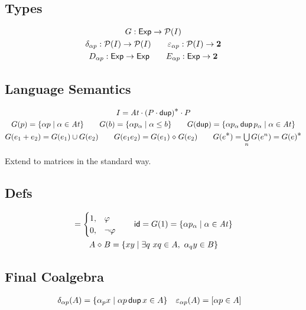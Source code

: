 \documentclass{article}
\newcommand\At{\ensuremath{\mathit{At}}}
\renewcommand\smash{\mathrel{\diamond}}
\newcommand\pdup{\mathop{\mathsf{dup}}}
\newcommand\Two{\mathbf{2}}
\newcommand\Exp{\mathsf{Exp}}
\newcommand\bval[1]{[#1]}
\renewcommand\star{^{\textstyle *}}
\newcommand\id{\mathsf{id}}
\newcommand\sbigcup{\mathop{\textstyle\bigcup}}
\begin{document}
\subsection*{Types}

\begin{gather*}
G: \Exp \fun \powerset I\\
\delta_{\alpha p} : \powerset I \fun \powerset I
\qquad
\eps_{\alpha p} : \powerset I \fun \Two\\
D_{\alpha p} : \Exp \fun \Exp
\qquad
E_{\alpha p} : \Exp \fun \Two
\end{gather*}

\subsection*{Language Semantics}

\begin{gather*}
I = \At\cdot (P\cdot\pdup)\star\cdot P\\
G(p) = \set{\alpha p}{\alpha\in\At} \qquad
G(b) = \set{\alpha p_\alpha}{\alpha\leq b} \qquad
G(\pdup) = \set{\alpha p_\alpha\pdup p_\alpha}{\alpha\in\At}\\
G(e_1+e_2) = G(e_1)\cup G(e_2) \qquad
G(e_1e_2) = G(e_1)\smash G(e_2) \qquad
G(e\star) = \sbigcup_n G(e^n) = G(e)\star
\end{gather*}

Extend to matrices in the standard way.

\subsection*{Defs}

\begin{gather*}
\bval\phi = \begin{cases}
1, & \phi\\
0, & \neg\phi
\end{cases}
\qquad
\id = G(1) = \set{\alpha p_\alpha}{\alpha\in\At}\\
A\smash B = \set{xy}{\exists q\ xq\in A,\ \alpha_qy\in B}
\end{gather*}

\subsection*{Final Coalgebra}

\begin{align*}
\delta_{\alpha p}(A) &= \set{\alpha_p x}{\alpha p\pdup x\in A}
&
\eps_{\alpha p}(A) &= \bval{\alpha p\in A}
\end{align*}
\end{document}
